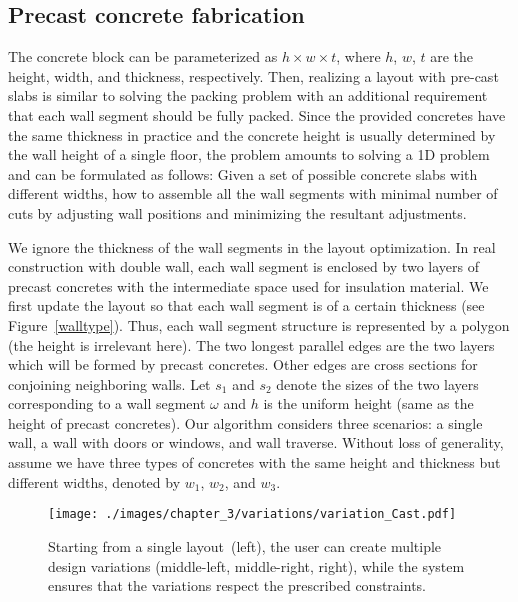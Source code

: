 \subsection{Precast concrete fabrication}

The concrete block can be parameterized as $h \times w \times t$, where $h$, $w$, $t$ are the height, width, and thickness, respectively. Then, realizing a layout with pre-cast slabs is similar to solving the packing problem \cite{korf2003optimal} with an additional requirement that each wall segment should be fully packed. Since the provided concretes have the same thickness in practice and the concrete height is usually determined by the wall height of a single floor, the problem amounts to solving a 1D problem and can be formulated as follows:
Given a set of possible concrete slabs with different widths, how to assemble all the wall segments with minimal number of cuts by adjusting wall positions and minimizing the resultant adjustments.

We ignore the thickness of the wall segments in the layout optimization. In real construction with double wall, each wall segment is enclosed by two layers of precast concretes with the intermediate space used for insulation material. We first update the layout so that each wall segment is of a certain thickness (see Figure~\ref{walltype}). Thus, each wall segment structure is represented by a polygon (the height is irrelevant here). The two longest parallel edges are the two layers which will be formed by precast concretes. Other edges are cross sections for conjoining neighboring walls. Let $s_1$ and $s_2$ denote the sizes of the two layers corresponding to a wall segment $\omega$ and $h$ is the uniform height (same as the height of precast concretes). Our algorithm considers three scenarios: a single wall, a wall with doors or windows, and wall traverse. Without loss of generality, assume we have three types of concretes with the same height and thickness but different widths, denoted by $w_1$, $w_2$, and $w_3$.

\begin{figure}[t!]
\centering
\texttt{[image: ./images/chapter\_3/variations/variation\_Cast.pdf]}
\caption{Starting from a single layout~(left), the user can create multiple design variations (middle-left, middle-right, right), while the system ensures that the variations respect the prescribed constraints.}
\label{variations}
\vspace{-.1in}
\end{figure}

